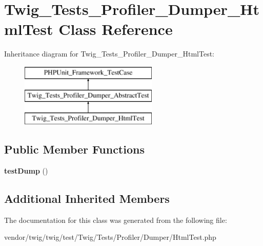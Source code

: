 \hypertarget{classTwig__Tests__Profiler__Dumper__HtmlTest}{}\section{Twig\+\_\+\+Tests\+\_\+\+Profiler\+\_\+\+Dumper\+\_\+\+Html\+Test Class Reference}
\label{classTwig__Tests__Profiler__Dumper__HtmlTest}
Inheritance diagram for Twig\+\_\+\+Tests\+\_\+\+Profiler\+\_\+\+Dumper\+\_\+\+Html\+Test\+:\begin{figure}[H]
\begin{center}
\leavevmode
\includegraphics[height=3.000000cm]{classTwig__Tests__Profiler__Dumper__HtmlTest}
\end{center}
\end{figure}
\subsection*{Public Member Functions}
\begin{DoxyCompactItemize}
\item 
{\bfseries test\+Dump} ()\hypertarget{classTwig__Tests__Profiler__Dumper__HtmlTest_ab6e5671cb437249f85c39e9b68ce7910}{}\label{classTwig__Tests__Profiler__Dumper__HtmlTest_ab6e5671cb437249f85c39e9b68ce7910}

\end{DoxyCompactItemize}
\subsection*{Additional Inherited Members}


The documentation for this class was generated from the following file\+:\begin{DoxyCompactItemize}
\item 
vendor/twig/twig/test/\+Twig/\+Tests/\+Profiler/\+Dumper/Html\+Test.\+php\end{DoxyCompactItemize}
